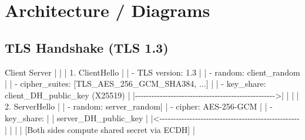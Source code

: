 \documentclass[11pt]{article}
\newenvironment{Shaded}{\begin{snugshade}}{\end{snugshade}}
\newcommand{\DecValTok}[1]{\textcolor[rgb]{0.96,0.45,0.00}{#1}}
\newcommand{\FloatTok}[1]{\textcolor[rgb]{0.96,0.45,0.00}{#1}}
\newcommand{\NormalTok}[1]{\textcolor[rgb]{0.81,0.81,0.76}{#1}}
\newcommand{\OperatorTok}[1]{\textcolor[rgb]{0.81,0.81,0.76}{#1}}
\begin{document}
\section{Architecture / Diagrams}\label{architecture--diagrams}

\subsection{TLS Handshake (TLS 1.3)}\label{tls-handshake-tls-13}


\begin{Shaded}
\begin{Highlighting}[]
\NormalTok{Client                                              Server}
  \OperatorTok{|}                                                    \OperatorTok{|}
  \OperatorTok{|} \FloatTok{1.}\NormalTok{ ClientHello                                     }\OperatorTok{|}
  \OperatorTok{|}    \OperatorTok{{-}}\NormalTok{ TLS version: }\FloatTok{1.3}                              \OperatorTok{|}
  \OperatorTok{|}    \OperatorTok{{-}}\NormalTok{ random: client\_random                         }\OperatorTok{|}
  \OperatorTok{|}    \OperatorTok{{-}}\NormalTok{ cipher\_suites: [TLS\_AES\_256\_GCM\_SHA384, ...]  }\OperatorTok{|}
  \OperatorTok{|}    \OperatorTok{{-}}\NormalTok{ key\_share: client\_DH\_public\_key (X25519)      }\OperatorTok{|}
  \OperatorTok{|{-}{-}{-}{-}{-}{-}{-}{-}{-}{-}{-}{-}{-}{-}{-}{-}{-}{-}{-}{-}{-}{-}{-}{-}{-}{-}{-}{-}{-}{-}{-}{-}{-}{-}{-}{-}{-}{-}{-}{-}{-}{-}{-}{-}{-}{-}{-}{-}{-}{-}{-}\textgreater{}|}
  \OperatorTok{|}                                                    \OperatorTok{|}
  \OperatorTok{|}                          \FloatTok{2.}\NormalTok{ ServerHello            }\OperatorTok{|}
  \OperatorTok{|}                             \OperatorTok{{-}}\NormalTok{ random: server\_random}\OperatorTok{|}
  \OperatorTok{|}                             \OperatorTok{{-}}\NormalTok{ cipher: AES}\OperatorTok{{-}}\DecValTok{256}\OperatorTok{{-}}\NormalTok{GCM  }\OperatorTok{|}
  \OperatorTok{|}                             \OperatorTok{{-}}\NormalTok{ key\_share:           }\OperatorTok{|}
  \OperatorTok{|}\NormalTok{                               server\_DH\_public\_key }\OperatorTok{|}
  \OperatorTok{|\textless{}{-}{-}{-}{-}{-}{-}{-}{-}{-}{-}{-}{-}{-}{-}{-}{-}{-}{-}{-}{-}{-}{-}{-}{-}{-}{-}{-}{-}{-}{-}{-}{-}{-}{-}{-}{-}{-}{-}{-}{-}{-}{-}{-}{-}{-}{-}{-}{-}{-}{-}{-}|}
  \OperatorTok{|}                                                    \OperatorTok{|}
  \OperatorTok{|}\NormalTok{ [Both sides compute shared secret via ECDH]        }\OperatorTok{|}

\end{Highlighting}
\end{Shaded}
\end{document}

